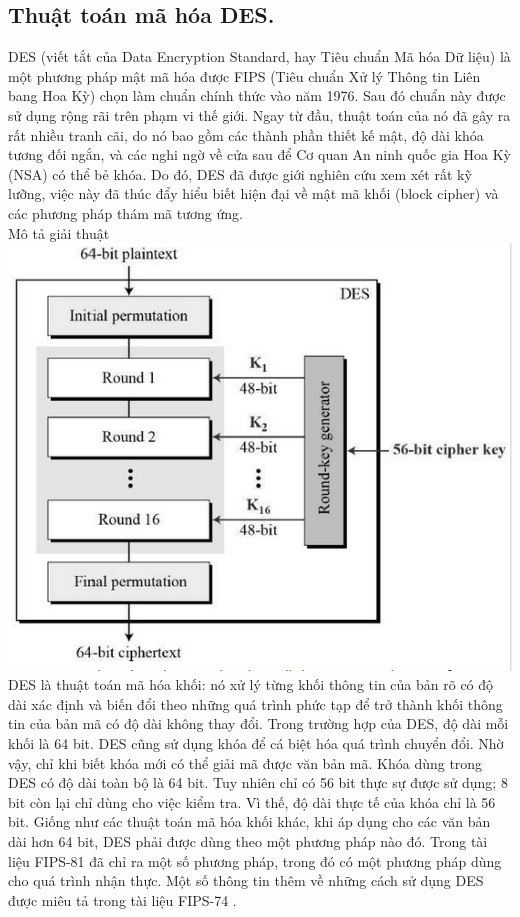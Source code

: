 \documentclass[paper=a4, fontsize=11pt]{scrartcl}	%
\numberwithin{equation}{section}															%
\numberwithin{figure}{section}																%
\numberwithin{table}{section}																%
\begin{document}
\subsection {Thuật toán mã hóa DES.}
DES (viết tắt của Data Encryption Standard, hay Tiêu chuẩn Mã hóa Dữ liệu) là một phương pháp mật mã hóa được FIPS (Tiêu chuẩn Xử lý Thông tin Liên bang Hoa Kỳ) chọn làm chuẩn chính thức vào năm 1976. Sau đó chuẩn này được sử dụng rộng rãi trên phạm vi thế giới. Ngay từ đầu, thuật toán của nó đã gây ra rất nhiều tranh cãi, do nó bao gồm các thành phần thiết kế mật, độ dài khóa tương đối ngắn, và các nghi ngờ về cửa sau để Cơ quan An ninh quốc gia Hoa Kỳ (NSA) có thể bẻ khóa. Do đó, DES đã được giới nghiên cứu xem xét rất kỹ lưỡng, việc này đã thúc đẩy hiểu biết hiện đại về mật mã khối (block cipher) và các phương pháp thám mã tương ứng.\\[1cm]
Mô tả giải thuật\\[0.5cm]
\includegraphics[scale=0.8]{DES}\\
DES là thuật toán mã hóa khối: nó xử lý từng khối thông tin của bản rõ có độ dài xác định và biến đổi theo những quá trình phức tạp để trở thành khối thông tin của bản mã có độ dài không thay đổi. Trong trường hợp của DES, độ dài mỗi khối là 64 bit. DES cũng sử dụng khóa để cá biệt hóa quá trình chuyển đổi. Nhờ vậy, chỉ khi biết khóa mới có thể giải mã được văn bản mã. Khóa dùng trong DES có độ dài toàn bộ là 64 bit. Tuy nhiên chỉ có 56 bit thực sự được sử dụng; 8 bit còn lại chỉ dùng cho việc kiểm tra. Vì thế, độ dài thực tế của khóa chỉ là 56 bit.
Giống như các thuật toán mã hóa khối khác, khi áp dụng cho các văn bản dài hơn 64 bit, DES phải được dùng theo một phương pháp nào đó. Trong tài liệu FIPS-81 đã chỉ ra một số phương pháp, trong đó có một phương pháp dùng cho quá trình nhận thực. Một số thông tin thêm về những cách sử dụng DES được miêu tả trong tài liệu FIPS-74 .
\end{document}
